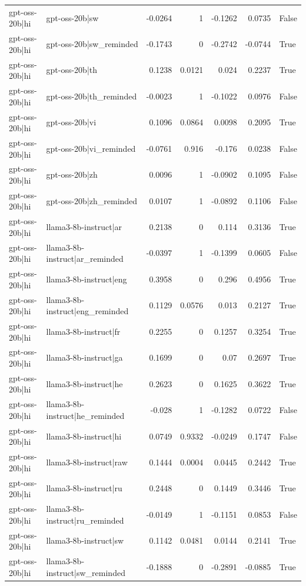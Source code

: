 \begin{table}
\begin{tabular}{l l r r r r l}
gpt-oss-20b|hi & gpt-oss-20b|sw & -0.0264 & 1 & -0.1262 & 0.0735 & False \\
gpt-oss-20b|hi & gpt-oss-20b|sw_reminded & -0.1743 & 0 & -0.2742 & -0.0744 & True \\
gpt-oss-20b|hi & gpt-oss-20b|th & 0.1238 & 0.0121 & 0.024 & 0.2237 & True \\
gpt-oss-20b|hi & gpt-oss-20b|th_reminded & -0.0023 & 1 & -0.1022 & 0.0976 & False \\
gpt-oss-20b|hi & gpt-oss-20b|vi & 0.1096 & 0.0864 & 0.0098 & 0.2095 & True \\
gpt-oss-20b|hi & gpt-oss-20b|vi_reminded & -0.0761 & 0.916 & -0.176 & 0.0238 & False \\
gpt-oss-20b|hi & gpt-oss-20b|zh & 0.0096 & 1 & -0.0902 & 0.1095 & False \\
gpt-oss-20b|hi & gpt-oss-20b|zh_reminded & 0.0107 & 1 & -0.0892 & 0.1106 & False \\
gpt-oss-20b|hi & llama3-8b-instruct|ar & 0.2138 & 0 & 0.114 & 0.3136 & True \\
gpt-oss-20b|hi & llama3-8b-instruct|ar_reminded & -0.0397 & 1 & -0.1399 & 0.0605 & False \\
gpt-oss-20b|hi & llama3-8b-instruct|eng & 0.3958 & 0 & 0.296 & 0.4956 & True \\
gpt-oss-20b|hi & llama3-8b-instruct|eng_reminded & 0.1129 & 0.0576 & 0.013 & 0.2127 & True \\
gpt-oss-20b|hi & llama3-8b-instruct|fr & 0.2255 & 0 & 0.1257 & 0.3254 & True \\
gpt-oss-20b|hi & llama3-8b-instruct|ga & 0.1699 & 0 & 0.07 & 0.2697 & True \\
gpt-oss-20b|hi & llama3-8b-instruct|he & 0.2623 & 0 & 0.1625 & 0.3622 & True \\
gpt-oss-20b|hi & llama3-8b-instruct|he_reminded & -0.028 & 1 & -0.1282 & 0.0722 & False \\
gpt-oss-20b|hi & llama3-8b-instruct|hi & 0.0749 & 0.9332 & -0.0249 & 0.1747 & False \\
gpt-oss-20b|hi & llama3-8b-instruct|raw & 0.1444 & 0.0004 & 0.0445 & 0.2442 & True \\
gpt-oss-20b|hi & llama3-8b-instruct|ru & 0.2448 & 0 & 0.1449 & 0.3446 & True \\
gpt-oss-20b|hi & llama3-8b-instruct|ru_reminded & -0.0149 & 1 & -0.1151 & 0.0853 & False \\
gpt-oss-20b|hi & llama3-8b-instruct|sw & 0.1142 & 0.0481 & 0.0144 & 0.2141 & True \\
gpt-oss-20b|hi & llama3-8b-instruct|sw_reminded & -0.1888 & 0 & -0.2891 & -0.0885 & True \\

\end{tabular}
\end{table}
